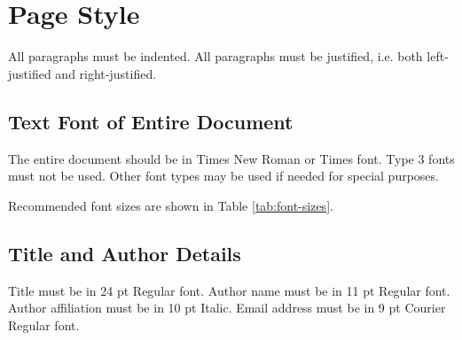 \documentclass[10pt,conference,a4paper]{IEEEtran}
\begin{document}
\section{Page Style}
\label{sec:page style}

All paragraphs must be indented.  All paragraphs must be
justified, i.e. both left-justified and right-justified.

\subsection{Text Font of Entire Document}

The entire document should be in Times New Roman or Times font.
Type 3 fonts must not be used.  Other font types may be used if
needed for special purposes.

Recommended font sizes are shown in Table \ref{tab:font-sizes}.

\subsection{Title and Author Details}
\label{sec:title and author details}

Title must be in 24 pt Regular font.  Author name must be in 11
pt Regular font.  Author affiliation must be in 10 pt Italic.
Email address must be in 9 pt Courier Regular font.
\end{document}

